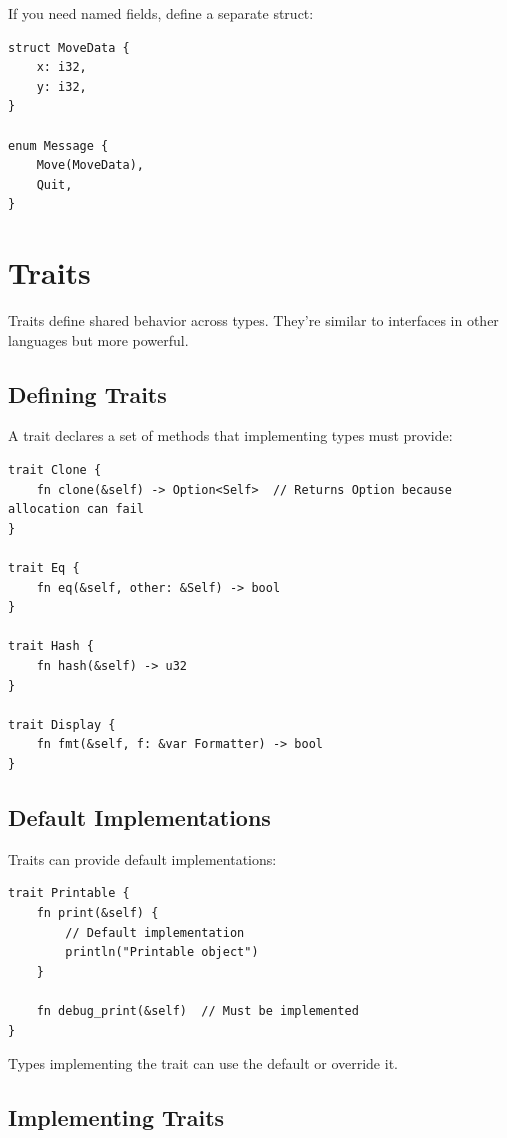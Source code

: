 If you need named fields, define a separate struct:

\begin{lstlisting}
struct MoveData {
    x: i32,
    y: i32,
}

enum Message {
    Move(MoveData),
    Quit,
}
\end{lstlisting}

\section{Traits}

Traits define shared behavior across types. They're similar to interfaces in other languages but more powerful.

\subsection{Defining Traits}

A trait declares a set of methods that implementing types must provide:

\begin{lstlisting}
trait Clone {
    fn clone(&self) -> Option<Self>  // Returns Option because allocation can fail
}

trait Eq {
    fn eq(&self, other: &Self) -> bool
}

trait Hash {
    fn hash(&self) -> u32
}

trait Display {
    fn fmt(&self, f: &var Formatter) -> bool
}
\end{lstlisting}

\subsection{Default Implementations}

Traits can provide default implementations:

\begin{lstlisting}
trait Printable {
    fn print(&self) {
        // Default implementation
        println("Printable object")
    }

    fn debug_print(&self)  // Must be implemented
}
\end{lstlisting}

Types implementing the trait can use the default or override it.

\subsection{Implementing Traits}

